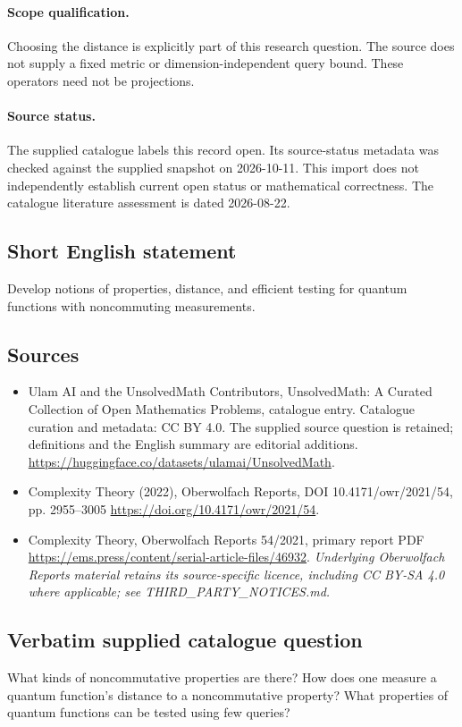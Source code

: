 \documentclass[11pt]{article}
\begin{document}
\paragraph{Scope qualification.}
Choosing the distance is explicitly part of this research question. The source does not supply a fixed metric or dimension-independent query bound. These operators need not be projections.
\paragraph{Source status.}
The supplied catalogue labels this record open. Its source-status metadata was checked against the supplied snapshot on 2026-10-11. This import does not independently establish current open status or mathematical correctness. The catalogue literature assessment is dated 2026-08-22.
\subsection{Short English statement}
Develop notions of properties, distance, and efficient testing for quantum functions with noncommuting measurements.
\subsection{Sources}
\begin{itemize}
\item[S1] Ulam AI and the UnsolvedMath Contributors, UnsolvedMath: A Curated Collection of Open Mathematics Problems, catalogue entry. Catalogue curation and metadata: CC BY 4.0. The supplied source question is retained; definitions and the English summary are editorial additions.
\url{https://huggingface.co/datasets/ulamai/UnsolvedMath}.
\item[S2] Complexity Theory (2022), Oberwolfach Reports, DOI 10.4171/owr/2021/54, pp. 2955--3005
\url{https://doi.org/10.4171/owr/2021/54}.
\item[S3] Complexity Theory, Oberwolfach Reports 54/2021, primary report PDF
\url{https://ems.press/content/serial-article-files/46932}.
\textit{Underlying Oberwolfach Reports material retains its source-specific licence, including CC BY-SA 4.0 where applicable; see THIRD\_PARTY\_NOTICES.md.}
\end{itemize}
\subsection{Verbatim supplied catalogue question}
What kinds of noncommutative properties are there? How does one measure a quantum function’s distance to a noncommutative property? What properties of quantum functions can be tested using few queries?
\end{document}
